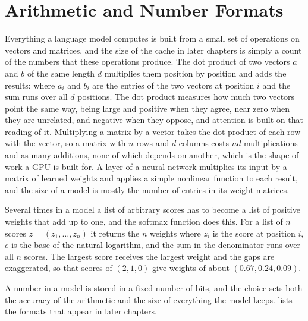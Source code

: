 \section{Arithmetic and Number Formats}
\label{ch:matrix}

Everything a language model computes is built from a small set of operations
on vectors and matrices, and the size of the cache in later chapters is
simply a count of the numbers that these operations produce. The dot product
of two vectors $a$ and $b$ of the same length $d$ multiplies them position by
position and adds the results:
where $a_i$ and $b_i$ are the entries of the two vectors at position $i$ and
the sum runs over all $d$ positions. The dot product measures how much two
vectors point the same way, being large and positive when they agree, near
zero when they are unrelated, and negative when they oppose, and attention is
built on that reading of it. Multiplying a matrix by a vector takes the dot
product of each row with the vector, so a matrix with $n$ rows and $d$
columns costs $n d$ multiplications and as many additions, none of which
depends on another, which is the shape of work a GPU is built for. A layer
of a neural network multiplies its input by a matrix of learned weights and
applies a simple nonlinear function to each result, and the size of a model
is mostly the number of entries in its weight matrices.

Several times in a model a list of arbitrary scores has to become a list of
positive weights that add up to one, and the softmax function does this. For
a list of $n$ scores $z = (z_1, \dots, z_n)$ it returns the $n$ weights
where $z_i$ is the score at position $i$, $e$ is the base of the natural
logarithm, and the sum in the denominator runs over all $n$ scores. The
largest score receives the largest weight and the gaps are exaggerated,
so that scores of $(2, 1, 0)$ give weights of about $(0.67, 0.24, 0.09)$.

A number in a model is stored in a fixed number of bits, and the choice sets
both the accuracy of the arithmetic and the size of everything the model
keeps.  lists the formats that appear in later chapters.

